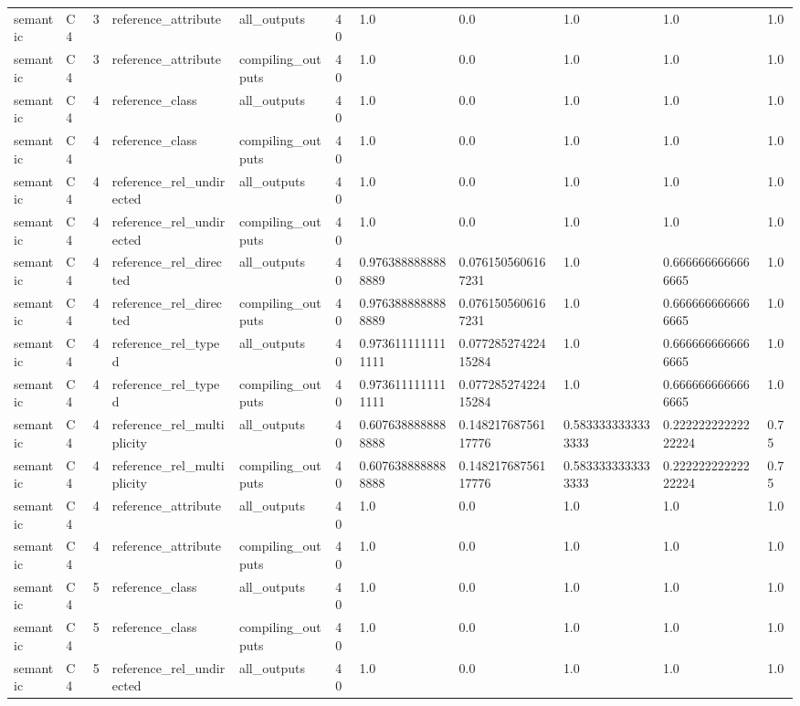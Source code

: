 \begin{tabular}{lllllllllll}
semantic & C4 & 3 & reference\_attribute & all\_outputs & 40 & 1.0 & 0.0 & 1.0 & 1.0 & 1.0 \\
semantic & C4 & 3 & reference\_attribute & compiling\_outputs & 40 & 1.0 & 0.0 & 1.0 & 1.0 & 1.0 \\
semantic & C4 & 4 & reference\_class & all\_outputs & 40 & 1.0 & 0.0 & 1.0 & 1.0 & 1.0 \\
semantic & C4 & 4 & reference\_class & compiling\_outputs & 40 & 1.0 & 0.0 & 1.0 & 1.0 & 1.0 \\
semantic & C4 & 4 & reference\_rel\_undirected & all\_outputs & 40 & 1.0 & 0.0 & 1.0 & 1.0 & 1.0 \\
semantic & C4 & 4 & reference\_rel\_undirected & compiling\_outputs & 40 & 1.0 & 0.0 & 1.0 & 1.0 & 1.0 \\
semantic & C4 & 4 & reference\_rel\_directed & all\_outputs & 40 & 0.9763888888888889 & 0.0761505606167231 & 1.0 & 0.6666666666666665 & 1.0 \\
semantic & C4 & 4 & reference\_rel\_directed & compiling\_outputs & 40 & 0.9763888888888889 & 0.0761505606167231 & 1.0 & 0.6666666666666665 & 1.0 \\
semantic & C4 & 4 & reference\_rel\_typed & all\_outputs & 40 & 0.9736111111111111 & 0.07728527422415284 & 1.0 & 0.6666666666666665 & 1.0 \\
semantic & C4 & 4 & reference\_rel\_typed & compiling\_outputs & 40 & 0.9736111111111111 & 0.07728527422415284 & 1.0 & 0.6666666666666665 & 1.0 \\
semantic & C4 & 4 & reference\_rel\_multiplicity & all\_outputs & 40 & 0.6076388888888888 & 0.14821768756117776 & 0.5833333333333333 & 0.22222222222222224 & 0.75 \\
semantic & C4 & 4 & reference\_rel\_multiplicity & compiling\_outputs & 40 & 0.6076388888888888 & 0.14821768756117776 & 0.5833333333333333 & 0.22222222222222224 & 0.75 \\
semantic & C4 & 4 & reference\_attribute & all\_outputs & 40 & 1.0 & 0.0 & 1.0 & 1.0 & 1.0 \\
semantic & C4 & 4 & reference\_attribute & compiling\_outputs & 40 & 1.0 & 0.0 & 1.0 & 1.0 & 1.0 \\
semantic & C4 & 5 & reference\_class & all\_outputs & 40 & 1.0 & 0.0 & 1.0 & 1.0 & 1.0 \\
semantic & C4 & 5 & reference\_class & compiling\_outputs & 40 & 1.0 & 0.0 & 1.0 & 1.0 & 1.0 \\
semantic & C4 & 5 & reference\_rel\_undirected & all\_outputs & 40 & 1.0 & 0.0 & 1.0 & 1.0 & 1.0 \\

\end{tabular}
